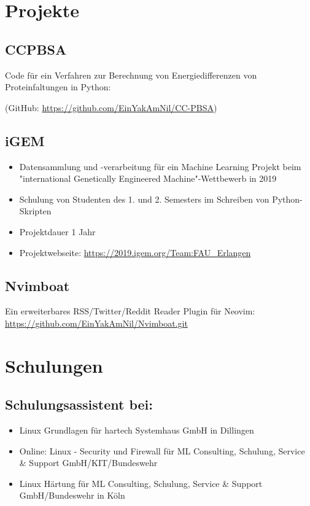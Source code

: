 \documentclass{article}
\begin{document}
\section{Projekte}

\subsection{CCPBSA}
Code für ein Verfahren zur Berechnung von Energiedifferenzen von Proteinfaltungen in Python:

(GitHub: \href{https://github.com/EinYakAmNil/CC-PBSA}{https://github.com/EinYakAmNil/CC-PBSA})

\subsection{iGEM}

\begin{itemize}
\item Datensammlung und -verarbeitung für ein Machine Learning Projekt beim "international Genetically Engineered Machine"-Wettbewerb in 2019
\item Schulung von Studenten des 1. und 2. Semesters im Schreiben von Python-Skripten
\item Projektdauer 1 Jahr
\item Projektwebseite: \href{https://2019.igem.org/Team:FAU_Erlangen}{https://2019.igem.org/Team:FAU\_Erlangen}
\end{itemize}

\subsection{Nvimboat}

Ein erweiterbares RSS/Twitter/Reddit Reader Plugin für Neovim: \href{https://github.com/EinYakAmNil/Nvimboat.git}{https://github.com/EinYakAmNil/Nvimboat.git}

\section{Schulungen}

\subsection{Schulungsassistent bei:}

\begin{itemize}
\item Linux Grundlagen für hartech Systemhaus GmbH in Dillingen
\item Online: Linux - Security und Firewall für ML Consulting, Schulung, Service \& Support GmbH/KIT/Bundeswehr
\item Linux Härtung für ML Consulting, Schulung, Service \& Support GmbH/Bundeswehr in Köln
\end{itemize}
\end{document}
